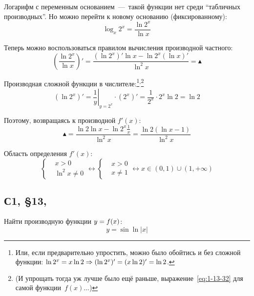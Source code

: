 \documentclass[a4paper,12pt]{article}
\begin{document}
  \begin{solution}
    Логарифм с переменным основанием~---~такой функции нет среди ``табличных производных''.
    Но можно перейти к новому основанию (фиксированному):
    \begin{equation}\label{eq:1-13-32}
      \log_x 2^x = \frac{\ln 2^x}{\ln x}
    \end{equation}
    
    Теперь можно воспользоваться правилом вычисления производной частного:
    \[
      \left(\frac{\ln 2^x}{\ln x}\right)' = \frac{(\ln 2^x)' \ln x - \ln 2^x (\ln x)'}{\ln^2 x} = \blacktriangle
    \]
    
    Производная сложной функции в числителе:\footnote{
      Или, если предварительно упростить, можно было обойтись и без сложной функции: $\ln 2^x \hm= x \ln 2 \Rightarrow (\ln 2^x)' \hm= (x \ln 2)' = \ln 2$.
    }\textsuperscript{,}\footnote{
      (И упрощать тогда уж лучше было ещё раньше, выражение~\eqref{eq:1-13-32} для самой функции~$f(x)$...)
    }  %
    \[
      (\ln 2^x)' = \left.\frac{1}{y}\right|_{y = 2^x} \cdot (2^x)' = \frac{1}{2^x} \cdot 2^x \ln 2 = \ln 2
    \]
    
    Поэтому, возвращаясь к производной $f'(x)$:
    \[
      \blacktriangle = \frac{\ln 2 \ln x - \ln 2^x \frac{1}{x}}{\ln^2 x} = \frac{\ln 2 (\ln x - 1)}{\ln^2 x}
    \]
    
    Область определения $f'(x)$:
    \[
      \left\{
        \begin{aligned}
          &x > 0\\
          &\ln^2 x \not= 0
        \end{aligned}
      \right. \leftrightarrow
      \left\{
        \begin{aligned}
          &x > 0\\
          &x \not= 1
        \end{aligned}
      \right. \leftrightarrow x \in (0, 1) \cup (1, +\infty)
    \]
  \end{solution}
  
  
  \subsection{С1, \S 13, }
  
  Найти производную функции $y \hm= f(x)$:
  \[
    y = \sin \ln |x|
  \]
  
\end{document}
